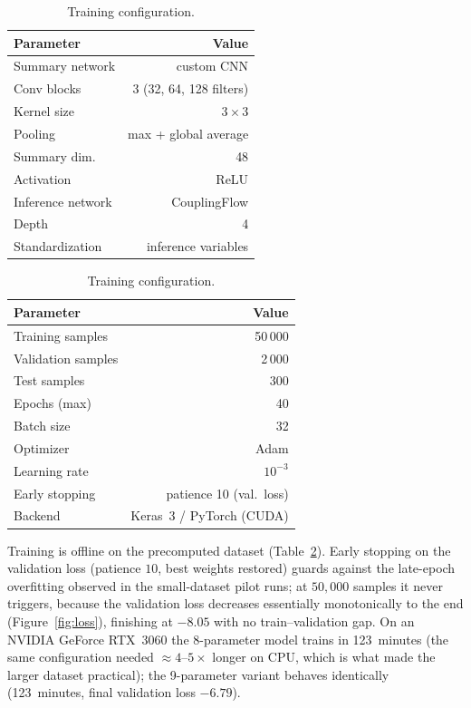 \documentclass[11pt,a4paper]{article}
\newcommand{\trainTime}{123}\newcommand{\trainTimeK}{123}
\newcommand{\valLossFinal}{-8.05}\newcommand{\valLossFinalK}{-6.79}
\begin{document}
\begin{table}[H]
\begin{minipage}[t]{0.52\textwidth}
\centering
\caption{Model architecture.}
\label{tab:architecture}
\begin{tabular}{lr}
\toprule
Parameter & Value \\
\midrule
Summary network       & custom CNN \\
\quad Conv blocks     & 3 (32, 64, 128 filters) \\
\quad Kernel size     & $3\times3$ \\
\quad Pooling         & max + global average \\
\quad Summary dim.    & 48 \\
\quad Activation      & ReLU \\
Inference network     & CouplingFlow \\
\quad Depth           & 4 \\
\quad Standardization & inference variables \\
\bottomrule
\end{tabular}
\end{minipage}\hfill
\begin{minipage}[t]{0.44\textwidth}
\centering
\caption{Training configuration.}
\label{tab:training}
\begin{tabular}{lr}
\toprule
Parameter & Value \\
\midrule
Training samples   & 50\,000 \\
Validation samples & 2\,000 \\
Test samples       & 300 \\
Epochs (max)       & 40 \\
Batch size         & 32 \\
Optimizer          & Adam \\
Learning rate      & $10^{-3}$ \\
Early stopping     & patience 10 (val.\ loss) \\
Backend            & Keras~3 / PyTorch (CUDA) \\
\bottomrule
\end{tabular}
\end{minipage}
\end{table}

Training is offline on the precomputed dataset (Table~\ref{tab:training}). Early
stopping on the validation loss (patience $10$, best weights restored) guards
against the late-epoch overfitting observed in the small-dataset pilot runs; at
$50{,}000$ samples it never triggers, because the validation loss decreases
essentially monotonically to the end (Figure~\ref{fig:loss}), finishing at
$\valLossFinal$ with no train--validation gap. On an NVIDIA GeForce RTX~3060 the
8-parameter model trains in \trainTime\ minutes (the same configuration needed
$\approx 4$--$5\times$ longer on CPU, which is what made the larger dataset
practical); the 9-parameter variant behaves identically (\trainTimeK\ minutes,
final validation loss $\valLossFinalK$).
\end{document}
